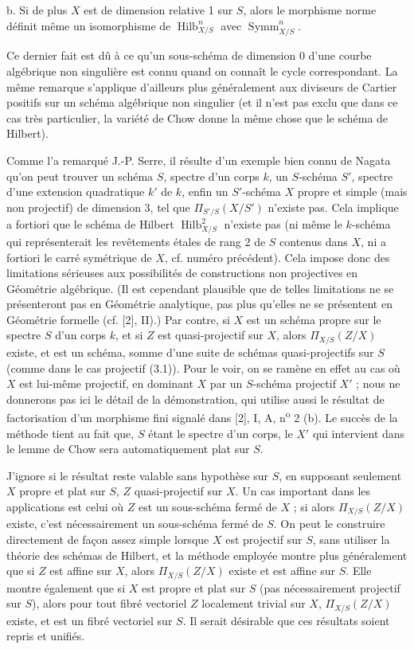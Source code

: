 \medskip
\noindent b. Si de plus $X$ est de dimension relative 1 sur $S$, alors le
morphisme norme définit même un isomorphisme de
$\operatorname{Hilb}^n_{X/S}$ avec $\operatorname{Symm}^n_{X/S}$.

Ce dernier fait est dû à ce qu'un sous-schéma de dimension 0 d'une courbe
algébrique non singulière est connu quand on connaît le cycle correspondant. La
même remarque s'applique d'ailleurs plus généralement aux diviseurs de Cartier
positifs sur un schéma algébrique non singulier (et il n'est pas exclu que dans
ce cas très particulier, la variété de Chow donne la même chose que le schéma
de Hilbert).


Comme l'a remarqué J.-P. Serre, il résulte d'un exemple bien connu de Nagata
qu'on peut trouver un schéma $S$, spectre d'un corps $k$, un $S$-schéma $S'$,
spectre d'une extension quadratique $k'$ de $k$, enfin un $S'$-schéma $X$
propre et simple (mais non projectif) de dimension 3, tel que
$\Pi_{S'/S}(X/S')$ n'existe pas. Cela implique a fortiori que le schéma de
Hilbert $\operatorname{Hilb}^2_{X/S}$ n'existe pas (ni même le $k$-schéma qui
représenterait les revêtements étales de rang 2 de $S$ contenus dans $X$, ni a
fortiori le carré symétrique de $X$, cf. numéro précédent). Cela impose donc
des limitations sérieuses aux possibilités de constructions non projectives en
Géométrie algébrique. (Il est cependant plausible que de telles limitations ne
se présenteront pas en Géométrie analytique, pas plus qu'elles ne se présentent
en Géométrie formelle (cf. [2], II).) Par contre, si $X$ est un schéma propre
sur le spectre $S$ d'un corps $k$, et si $Z$ est quasi-projectif sur $X$, alors
$\Pi_{X/S}(Z/X)$ existe, et est un schéma, somme d'une suite de schémas
quasi-projectifs sur $S$ (comme dans le cas projectif (3.1)). Pour le voir, on
se ramène en effet au cas où $X$ est lui-même projectif, en dominant $X$ par un
$S$-schéma projectif $X'$ ; nous ne donnerons pas ici le détail de la
démonstration, qui utilise aussi le résultat de factorisation d'un morphisme
fini signalé dans [2], I, A, n\textsuperscript{o} 2 (b). Le succès de la méthode
tient au fait que, $S$ étant le spectre d'un corps, le $X'$ qui intervient dans
le lemme de Chow sera automatiquement plat sur $S$.

J'ignore si le résultat reste valable sans hypothèse sur $S$, en supposant
seulement $X$ propre et plat sur $S$, $Z$ quasi-projectif sur $X$. Un cas
important dans les applications est celui où $Z$ est un sous-schéma fermé de
$X$ ; si alors $\Pi_{X/S}(Z/X)$ existe, c'est nécessairement un sous-schéma
fermé de $S$. On peut le
construire directement de façon assez simple lorsque $X$ est projectif sur $S$,
sans utiliser la théorie des schémas de Hilbert, et la méthode employée montre
plus généralement que si $Z$ est affine sur $X$, alors $\Pi_{X/S}(Z/X)$ existe
et est affine sur $S$. Elle montre également que si $X$ est propre et plat sur
$S$ (pas nécessairement projectif sur $S$), alors pour tout fibré vectoriel $Z$
localement trivial sur $X$, $\Pi_{X/S}(Z/X)$ existe, et est un fibré vectoriel
sur $S$. Il serait désirable que ces résultats soient repris et unifiés.

